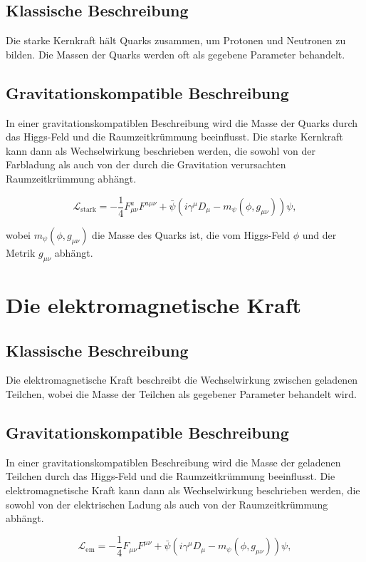 \documentclass{article}
\begin{document}
	\subsection{Klassische Beschreibung}
	Die starke Kernkraft hält Quarks zusammen, um Protonen und Neutronen zu bilden. Die Massen der Quarks werden oft als gegebene Parameter behandelt.
	
	\subsection{Gravitationskompatible Beschreibung}
	In einer gravitationskompatiblen Beschreibung wird die Masse der Quarks durch das Higgs-Feld und die Raumzeitkrümmung beeinflusst. Die starke Kernkraft kann dann als Wechselwirkung beschrieben werden, die sowohl von der Farbladung als auch von der durch die Gravitation verursachten Raumzeitkrümmung abhängt.
	
	\begin{equation}
		\mathcal{L}_\text{stark} = -\frac{1}{4} F_{\mu\nu}^a F^{a\mu\nu} + \bar{\psi}(i \gamma^\mu D_\mu - m_\psi(\phi, g_{\mu\nu}))\psi,
	\end{equation}
	
	wobei $m_\psi(\phi, g_{\mu\nu})$ die Masse des Quarks ist, die vom Higgs-Feld $\phi$ und der Metrik $g_{\mu\nu}$ abhängt.
	
	\section{Die elektromagnetische Kraft}
	
	\subsection{Klassische Beschreibung}
	Die elektromagnetische Kraft beschreibt die Wechselwirkung zwischen geladenen Teilchen, wobei die Masse der Teilchen als gegebener Parameter behandelt wird.
	
	\subsection{Gravitationskompatible Beschreibung}
	In einer gravitationskompatiblen Beschreibung wird die Masse der geladenen Teilchen durch das Higgs-Feld und die Raumzeitkrümmung beeinflusst. Die elektromagnetische Kraft kann dann als Wechselwirkung beschrieben werden, die sowohl von der elektrischen Ladung als auch von der Raumzeitkrümmung abhängt.
	
	\begin{equation}
		\mathcal{L}_\text{em} = -\frac{1}{4} F_{\mu\nu} F^{\mu\nu} + \bar{\psi}(i \gamma^\mu D_\mu - m_\psi(\phi, g_{\mu\nu}))\psi,
	\end{equation}
	
\end{document}
